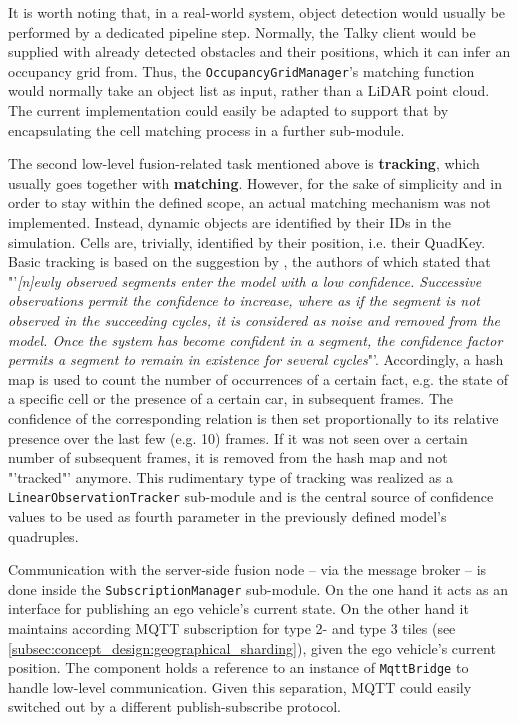 It is worth noting that, in a real-world system, object detection would usually be performed by a dedicated pipeline step. Normally, the Talky client would be supplied with already detected obstacles and their positions, which it can infer an occupancy grid from. Thus, the \texttt{OccupancyGridManager}'s matching function would normally take an object list as input, rather than a LiDAR point cloud. The current implementation could easily be adapted to support that by encapsulating the cell matching process in a further sub-module.
\par
\bigskip

The second low-level fusion-related task mentioned above is \textbf{tracking}, which usually goes together with \textbf{matching}. However, for the sake of simplicity and in order to stay within the defined scope, an actual matching mechanism was not implemented. Instead, dynamic objects are identified by their IDs in the simulation. Cells are, trivially, identified by their position, i.e. their QuadKey. Basic tracking is based on the suggestion by \cite{Crowley1993}, the authors of which stated that "'\textit{[n]ewly observed segments enter the model with a low confidence. Successive observations permit the confidence to increase, where as if the segment is not observed in the succeeding cycles, it is considered as noise and removed from the model. Once the system has become confident in a segment, the confidence factor permits a segment to remain in existence for several cycles}"'. Accordingly, a hash map is used to count the number of occurrences of a certain fact, e.g. the state of a specific cell or the presence of a certain car, in subsequent frames. The confidence of the corresponding relation is then set proportionally to its relative presence over the last few (e.g. 10) frames. If it was not seen over a certain number of subsequent frames, it is removed from the hash map and not "'tracked"' anymore. This rudimentary type of tracking was realized as a \texttt{LinearObservationTracker} sub-module and is the central source of confidence values to be used as fourth parameter in the previously defined model's quadruples.
\par
\bigskip

Communication with the server-side fusion node – via the message broker – is done inside the \texttt{SubscriptionManager} sub-module. On the one hand it acts as an interface for publishing an ego vehicle's current state. On the other hand it maintains according MQTT subscription for type 2- and type 3 tiles (see \cref{subsec:concept_design:geographical_sharding}), given the ego vehicle's current position. The component holds a reference to an instance of \texttt{MqttBridge} to handle low-level communication. Given this separation, MQTT could easily switched out by a different publish-subscribe protocol. 

